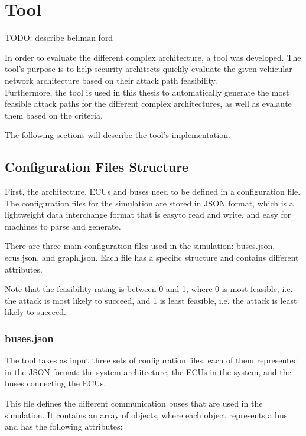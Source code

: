 \chapter{Tool}
\label{chp:tool}

TODO: describe bellman ford

In order to evaluate the different complex architecture, a tool was developed.
The tool's purpose is to help security architects quickly evaluate the given vehicular network architecture based on their \gls{attack path} feasibility.\\
Furthermore, the tool is used in this thesis to automatically generate the most feasible attack paths for the different complex architectures, 
as well as evalaute them based on the criteria.

The following sections will describe the tool's implementation.

\section{Configuration Files Structure}
\label{sec:config}

First, the architecture, ECUs and buses need to be defined in a configuration file.
The configuration files for the simulation are stored in JSON format, which is a lightweight data interchange format that is easyto read and write, and easy for machines to parse and generate.

There are three main configuration files used in the simulation: buses.json, ecus.json, and graph.json.
Each file has a specific structure and contains different attributes.

Note that the feasibility rating is between 0 and 1, where 0 is most feasible, i.e. the attack is most likely to succeed, and 1 is least feasible, i.e. the attack is least likely to succeed.

\subsection{buses.json}
\label{sec:buses}

The tool takes as input three sets of configuration files, each of them represented in the JSON format: 
the system architecture, the ECUs in the system, and the buses connecting the ECUs. 

This file defines the different communication buses that are used in the simulation. 
It contains an array of objects, where each object represents a bus and has the following attributes:

